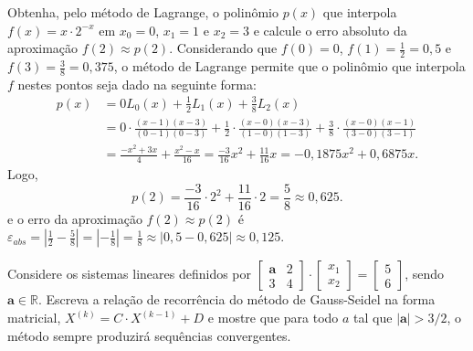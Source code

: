 \documentclass[12pt,a4paper]{article}
\newcommand*\R{\mathbb{R}}
\begin{document}
\begin{ExerciseList}
\Exercise[title={2,5}]
Obtenha, pelo método de Lagrange, o polinômio $p(x)$ que interpola $f(x) = x \cdot 2^{-x}$ em $x_0 = 0$, $x_1 = 1$ e $x_2 = 3$ e calcule o erro absoluto da aproximação $f(2) \approx p(2)$.
\Answer
Considerando que $f(0) = 0$, $f(1) = \frac{1}{2} = 0,5$ e $f(3) = \frac{3}{8} = 0,375$, o método de Lagrange permite que o polinômio que interpola $f$ nestes pontos seja dado na seguinte forma:
\begin{align*}
p(x)
& = 0 L_0(x) + \frac{1}{2}L_1(x) + \frac{3}{8} L_2(x) \\
& = 0 \cdot \frac{(x-1)(x-3)}{(0-1)(0-3)}
  + \frac{1}{2} \cdot \frac{(x-0)(x-3)}{(1-0)(1-3)}
  + \frac{3}{8} \cdot \frac{(x-0)(x-1)}{(3-0)(3-1)}\\
& = \frac{-x^2 + 3x}{4}
    + \frac{x^2 - x}{16}
  = \frac{-3}{16} x^2 + \frac{11}{16} x
  = -0,1875 x^2 + 0,6875 x.
\end{align*}
Logo,
\[
p(2) = \frac{-3}{16}\cdot 2^2 + \frac{11}{16} \cdot 2 = \frac{5}{8} \approx 0,625.
\]
e o erro da aproximação $f(2) \approx p(2)$ é $\varepsilon_{abs}
= \left| \frac{1}{2} - \frac{5}{8}\right|
= \left|-\frac{1}{8}\right|
= \frac{1}{8}
\approx \left|0,5 - 0,625\right|
\approx 0,125$.


\Exercise[title={2,5}]
Considere os sistemas lineares definidos por
$
\begin{bmatrix}
\mathbf{a} & 2\\3 & 4
\end{bmatrix}
\cdot
\begin{bmatrix}
x_1 \\ x_2
\end{bmatrix}
=
\begin{bmatrix}
5 \\6
\end{bmatrix}$,
sendo $\mathbf{a} \in \R$. Escreva a relação de recorrência do método de Gauss-Seidel na forma matricial,
$X^{(k)} = C \cdot X^{(k-1)} +D$
e mostre que para todo $a$ tal que $|\mathbf{a}| > 3/2$, o método sempre produzirá sequências convergentes.
\Answer


\end{ExerciseList}
\end{document}
